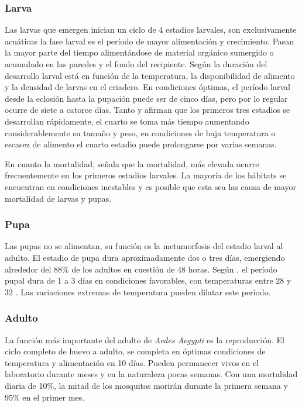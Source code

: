 \subsubsection{Larva}
\label{subsec:ciclo-biologico-larva}
Las larvas que emergen inician un ciclo de 4 estadios larvales, son exclusivamente acuáticas la fase larval es el
período de mayor alimentación y crecimiento. Pasan la mayor parte del tiempo alimentándose de material orgánico
sumergido o acumulado en las paredes y el fondo del recipiente\cite{web-site:gMonteroBiologia}. Según 
\cite{ThironIzcazaJ2003} la duración del desarrollo larval está en función de la temperatura, la
disponibilidad de alimento y la densidad de larvas en el criadero. En condiciones óptimas, el período larval
desde la eclosión hasta la pupación puede ser de cinco días, pero por lo regular ocurre de siete a catorce 
días. Tanto \cite{ThironIzcazaJ2003} y \cite{web-site:gMonteroBiologia} afirman que los primeros tres estadios se
desarrollan  rápidamente, el cuarto se toma más tiempo aumentando considerablemente  su tamaño y peso, en
condiciones de baja temperatura o escasez de alimento el cuarto estadio puede prolongarse por varias semanas. 

En cuanto la mortalidad,\cite{ThironIzcazaJ2003} señala que la mortalidad, más elevada ocurre frecuentemente en
los primeros estadios larvales. La mayoría de los hábitats se encuentran en condiciones inestables y es posible
que esta sea las causa de mayor mortalidad de larvas y pupas.

\subsubsection{Pupa}
\label{subsec:ciclo-biologico-pupa}
Las pupas no se alimentan, su función es la metamorfosis del estadio larval al adulto. El estadio de pupa dura
aproximadamente dos o tres días, emergiendo alrededor del 88\% de los adultos en cuestión de 48 
horas\cite{ThironIzcazaJ2003}. Según \cite{web-site:gMonteroBiologia}, el período pupal dura de 1 a 3 días en
condiciones favorables, con temperaturas entre 28 y 32 \textcelsius. Las variaciones extremas de temperatura
pueden dilatar este período.

\subsubsection{Adulto}
\label{subsec:ciclo-biologico-adulto}

La función más importante del adulto de \textit{Aedes Aegypti} es la reproducción. El ciclo completo de 
huevo a adulto, se completa en óptimas condiciones de temperatura y alimentación en 10 
días\cite{web-site:gMonteroBiologia}. Pueden permanecer vivos en el laboratorio durante meses y en la naturaleza
pocas semanas. Con una mortalidad diaria de 10\%, la mitad de los mosquitos morirán durante la primera semana y 
95\% en el primer mes\cite{ThironIzcazaJ2003}. 

